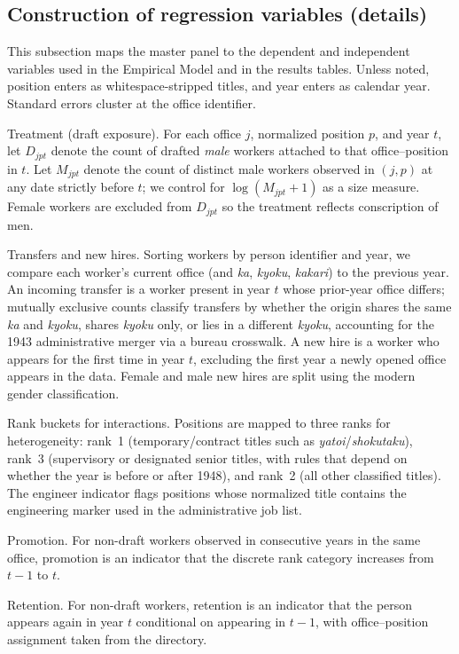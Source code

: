\subsection{Construction of regression variables (details)}
\label{sec:appendix-variables}

This subsection maps the master panel to the dependent and independent variables used in the Empirical Model and in the results tables. Unless noted, position enters as whitespace-stripped titles, and year enters as calendar year. Standard errors cluster at the office identifier.

Treatment (draft exposure). For each office $j$, normalized position $p$, and year $t$, let $D_{jpt}$ denote the count of drafted \emph{male} workers attached to that office--position in $t$. Let $M_{jpt}$ denote the count of distinct male workers observed in $(j,p)$ at any date strictly before $t$; we control for $\log(M_{jpt}+1)$ as a size measure. Female workers are excluded from $D_{jpt}$ so the treatment reflects conscription of men.

Transfers and new hires. Sorting workers by person identifier and year, we compare each worker's current office (and \emph{ka}, \emph{kyoku}, \emph{kakari}) to the previous year. An incoming transfer is a worker present in year $t$ whose prior-year office differs; mutually exclusive counts classify transfers by whether the origin shares the same \emph{ka} and \emph{kyoku}, shares \emph{kyoku} only, or lies in a different \emph{kyoku}, accounting for the 1943 administrative merger via a bureau crosswalk. A new hire is a worker who appears for the first time in year $t$, excluding the first year a newly opened office appears in the data. Female and male new hires are split using the modern gender classification.

Rank buckets for interactions. Positions are mapped to three ranks for heterogeneity: rank~1 (temporary/contract titles such as \emph{yatoi}/\emph{shokutaku}), rank~3 (supervisory or designated senior titles, with rules that depend on whether the year is before or after 1948), and rank~2 (all other classified titles). The engineer indicator flags positions whose normalized title contains the engineering marker used in the administrative job list.

Promotion. For non-draft workers observed in consecutive years in the same office, promotion is an indicator that the discrete rank category increases from $t-1$ to $t$.

Retention. For non-draft workers, retention is an indicator that the person appears again in year $t$ conditional on appearing in $t-1$, with office--position assignment taken from the directory.

